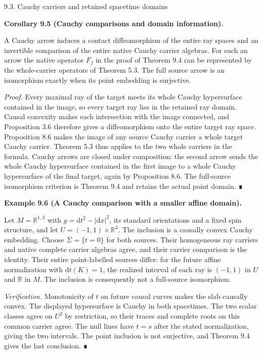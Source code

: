 \documentclass[
  english,
  11pt,
  reqno]{amsart}
\makeatletter
\newcommand{\pandocstatementheading}[1]{%
  \par\addpenalty{\@beginparpenalty}%
  \addvspace{.5\baselineskip plus .2\baselineskip minus .2\baselineskip}%
  {\normalfont\bfseries #1\par}%
  \nobreak\@afterindenttrue\@afterheading
}
\newcommand{\paperstatementsection}{\@startsection{subsection}{2}%
  \z@{.5\linespacing\@plus.7\linespacing}{.35\baselineskip}%
  {\normalfont\bfseries}}
\newcommand{\paperfirststatement}[1]{%
  {\normalfont\bfseries #1\par}%
  \nobreak\@afterindenttrue\@afterheading}
\makeatother
\begin{document}
\protect{}\label{sec:global-source-cauchy-embeddings}
\paperstatementsection{9.3. Cauchy carriers and retained spacetime
domains}\label{cauchy-carriers-and-retained-spacetime-domains}
\paperfirststatement{\protect{}\label{cor:global-cauchy-source-carriers}Corollary 9.5 (Cauchy comparisons and domain information).}

A Cauchy arrow induces a contact diffeomorphism of the entire ray spaces
and an invertible comparison of the entire native Cauchy carrier
algebras. For such an arrow the native operator \(F_f\) in the proof of
Theorem 9.4 can be represented by the whole-carrier operators of Theorem
5.3. The full source arrow is an isomorphism exactly when its point
embedding is surjective.

\emph{Proof.} Every maximal ray of the target meets its whole Cauchy
hypersurface contained in the image, so every target ray lies in the
retained ray domain. Causal convexity makes each intersection with the
image connected, and Proposition 3.6 therefore gives a diffeomorphism
onto the entire target ray space. Proposition 8.6 makes the image of any
source Cauchy carrier a whole target Cauchy carrier. Theorem 5.3 thus
applies to the two whole carriers in the formula. Cauchy arrows are
closed under composition: the second arrow sends the whole Cauchy
hypersurface contained in the first image to a whole Cauchy hypersurface
of the final target, again by Proposition 8.6. The full-source
isomorphism criterion is Theorem 9.4 and retains the actual point
domain. ∎

\pandocstatementheading{\protect{}\label{ex:global-cauchy-slab-domain}Example 9.6 (A Cauchy comparison with a smaller affine domain).}

Let \(M=\mathbb R^{1,3}\) with \(g=\mathrm dt^2-|\mathrm dx|^2\), its
standard orientations and a fixed spin structure, and let
\(U=(-1,1)\times\mathbb R^3\). The inclusion is a causally convex Cauchy
embedding. Choose \(\Sigma=\{t=0\}\) for both sources. Their homogeneous
ray carriers and native complete carrier algebras agree, and their
carrier comparison is the identity. Their entire point-labelled sources
differ: for the future affine normalization with \(\mathrm dt(K)=1\),
the realized interval of each ray is \((-1,1)\) in \(U\) and
\(\mathbb R\) in \(M\). The inclusion is consequently not a full-source
isomorphism.

\emph{Verification.} Monotonicity of \(t\) on future causal curves makes
the slab causally convex. The displayed hypersurface is Cauchy in both
spacetimes. The two scalar classes agree on \(U^2\) by restriction, so
their traces and complete roots on this common carrier agree. The null
lines have \(t=s\) after the stated normalization, giving the two
intervals. The point inclusion is not surjective, and Theorem 9.4 gives
the last conclusion. ∎
\end{document}
